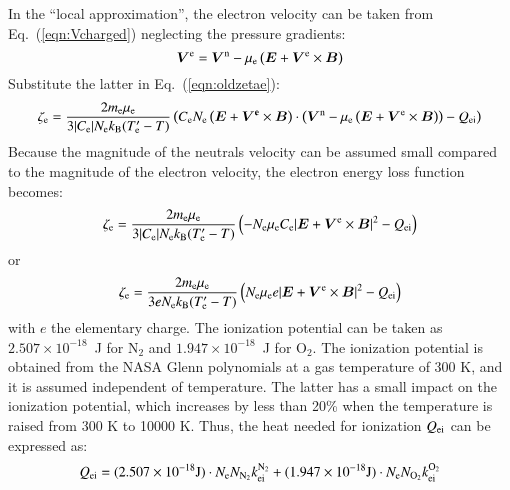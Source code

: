 \documentclass{warpdoc}
\newcommand{\mfd}{\displaystyle}
\renewcommand{\vec}[1]{\bm{#1}}
\let\citen\cite
\begin{document}
%
In the ``local approximation'',  the electron velocity can be taken from Eq.\ (\ref{eqn:Vcharged}) neglecting the pressure gradients:
%
\begin{equation}
  \vec{V}^{\rm e}=\vec{V}^{\rm n} - \mu_{\rm e} \left(\vec{E}+\vec{V}^{\rm e} \times \vec{B}\right)
\end{equation}
% 
Substitute the latter in Eq.\ (\ref{eqn:oldzetae}):
%
\begin{equation}
  \zeta_{\rm e}  
=  
 \frac{2 m_{\rm e} \mu_{\rm e}}{3 |C_{\rm e}| N_{\rm e} k_{\rm B} (T_{\rm e}^\prime-T) }
\left( C_{\rm e} N_{\rm e} \left(\vec{E} + \vec{V^{\rm e}} \times \vec{B}\right)\cdot \left(\vec{V}^{\rm n} - \mu_{\rm e} \left(\vec{E}+\vec{V}^{\rm e} \times \vec{B}\right)\right)
 - Q_{\rm ei}\right)
 \end{equation}
%
Because the magnitude of the neutrals velocity can be assumed small compared to the magnitude of the electron velocity, the electron energy loss function becomes:
%
\begin{equation}
  \zeta_{\rm e}  
=  
 \frac{2 m_{\rm e} \mu_{\rm e}}{3 |C_{\rm e}| N_{\rm e} k_{\rm B} (T_{\rm e}^\prime-T) }
\left(  -N_{\rm e} \mu_{\rm e} C_{\rm e} |\vec{E}+\vec{V}^{\rm e}\times \vec{B}|^2
 - Q_{\rm ei}\right)
 \end{equation}
%
or
%
\begin{equation}
  \zeta_{\rm e}  
=  
 \frac{2 m_{\rm e} \mu_{\rm e}}{3 e N_{\rm e} k_{\rm B} (T_{\rm e}^\prime-T) }
\left(  N_{\rm e} \mu_{\rm e} e |\vec{E}+\vec{V}^{\rm e}\times \vec{B}|^2
 - Q_{\rm ei}\right)
 \end{equation}
%
with $e$ the elementary charge. The ionization potential  can be taken as $2.507 \times 10^{-18}$~J for N$_2$ and $1.947 \times 10^{-18}$~J for O$_2$. The ionization potential is obtained from the NASA Glenn polynomials \citen{nasa:2002:mcbride} at a gas temperature of 300 K, and it is assumed independent of temperature. The latter has a small impact on the ionization potential, which increases by less than 20\% when the temperature is raised from 300 K to 10000 K. Thus, the heat needed for ionization $Q_{\rm ei}$ can be expressed as:
%
\begin{equation} 
 \begin{array}{r}\mfd
 Q_{\rm ei}= (2.507 \times 10^{-18} {\rm J}) \cdot N_{\rm e} N_{\rm N_2} k_{\rm ei}^{\rm N_2}
           + (1.947 \times 10^{-18} {\rm J}) \cdot  N_{\rm e} N_{\rm O_2} k_{\rm ei}^{\rm O_2}
 \end{array}
\end{equation}
\end{document}
